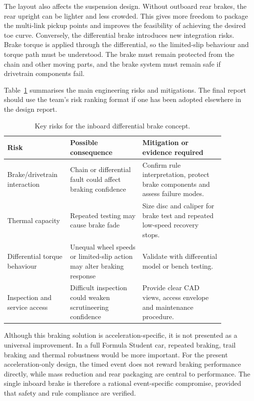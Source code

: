 The layout also affects the suspension design. Without outboard rear brakes, the rear upright can be lighter and less crowded. This gives more freedom to package the multi-link pickup points and improves the feasibility of achieving the desired toe curve. Conversely, the differential brake introduces new integration risks. Brake torque is applied through the differential, so the limited-slip behaviour and torque path must be understood. The brake must remain protected from the chain and other moving parts, and the brake system must remain safe if drivetrain components fail.

Table~\ref{tab:brakerisk} summarises the main engineering risks and mitigations. The final report should use the team's risk ranking format if one has been adopted elsewhere in the design report.

\begin{table}[H]
\caption{Key risks for the inboard differential brake concept.}
\label{tab:brakerisk}
\centering
\begin{tabular}{p{0.24\linewidth}p{0.30\linewidth}p{0.34\linewidth}}
\toprule
Risk & Possible consequence & Mitigation or evidence required \\
\midrule
Brake/drivetrain interaction & Chain or differential fault could affect braking confidence & Confirm rule interpretation, protect brake components and assess failure modes. \\
Thermal capacity & Repeated testing may cause brake fade & Size disc and caliper for brake test and repeated low-speed recovery stops. \\
Differential torque behaviour & Unequal wheel speeds or limited-slip action may alter braking response & Validate with differential model or bench testing. \\
Inspection and service access & Difficult inspection could weaken scrutineering confidence & Provide clear CAD views, access envelope and maintenance procedure. \\
\bottomrule
\end{tabular}
\end{table}

Although this braking solution is acceleration-specific, it is not presented as a universal improvement. In a full Formula Student car, repeated braking, trail braking and thermal robustness would be more important. For the present acceleration-only design, the timed event does not reward braking performance directly, while mass reduction and rear packaging are central to performance. The single inboard brake is therefore a rational event-specific compromise, provided that safety and rule compliance are verified.

